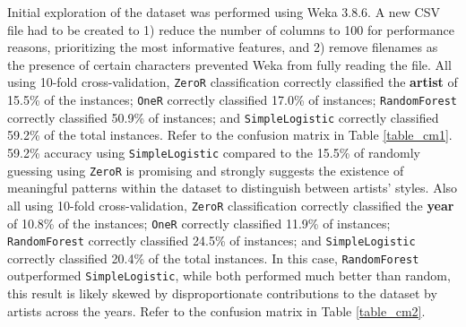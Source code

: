 \documentclass[article,pdftex,12pt,a4paper]{article}
\def\code#1{\texttt{#1}}
\begin{document}
Initial exploration of the dataset was performed using Weka 3.8.6. A new CSV file had to be created to 1) reduce the number of columns to 100 for performance reasons, prioritizing the most informative features, and 2) remove filenames as the presence of certain characters prevented Weka from fully reading the file. All using 10-fold cross-validation, \code{ZeroR} classification correctly classified the \textbf{artist} of 15.5\% of the instances; \code{OneR} correctly classified 17.0\% of instances; \code{RandomForest} correctly classified 50.9\% of instances; and \code{SimpleLogistic} correctly classified 59.2\% of the total instances. Refer to the confusion matrix in Table \ref{table_cm1}. 59.2\% accuracy using \code{SimpleLogistic} compared to the 15.5\% of randomly guessing using \code{ZeroR} is promising and strongly suggests the existence of meaningful patterns within the dataset to distinguish between artists' styles. Also all using 10-fold cross-validation, \code{ZeroR} classification correctly classified the \textbf{year} of 10.8\% of the instances; \code{OneR} correctly classified 11.9\% of instances; \code{RandomForest} correctly classified 24.5\% of instances; and \code{SimpleLogistic} correctly classified 20.4\% of the total instances. In this case, \code{RandomForest} outperformed \code{SimpleLogistic}, while both performed much better than random, this result is likely skewed by disproportionate contributions to the dataset by artists across the years. Refer to the confusion matrix in Table \ref{table_cm2}.
\end{document}
